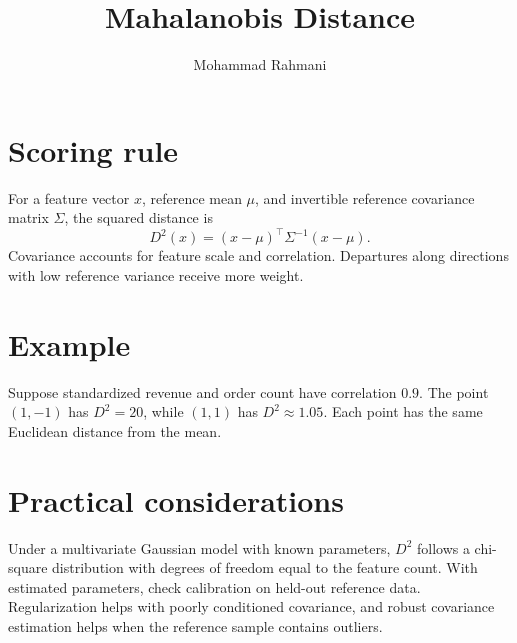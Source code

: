 \documentclass[a4paper]{article}
\title{Mahalanobis Distance}
\date{}
\author{Mohammad Rahmani}
\begin{document}
   \maketitle

\section{Scoring rule}
For a feature vector \(x\), reference mean \(\mu\), and invertible reference covariance matrix \(\Sigma\), the squared distance is
\[
D^2(x)=(x-\mu)^\top\Sigma^{-1}(x-\mu).
\]
Covariance accounts for feature scale and correlation. Departures along directions with low reference variance receive more weight.

\section{Example}
Suppose standardized revenue and order count have correlation \(0.9\). The point \((1,-1)\) has \(D^2=20\), while \((1,1)\) has \(D^2\approx 1.05\). Each point has the same Euclidean distance from the mean.

\section{Practical considerations}
Under a multivariate Gaussian model with known parameters, \(D^2\) follows a chi-square distribution with degrees of freedom equal to the feature count. With estimated parameters, check calibration on held-out reference data. Regularization helps with poorly conditioned covariance, and robust covariance estimation helps when the reference sample contains outliers.



   
   
\end{document}
